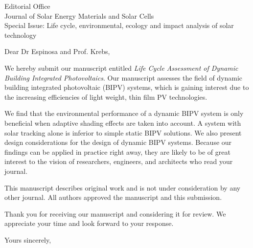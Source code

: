 \documentclass[a4paper,12pt]{letter}
\begin{document}
\begin{letter}{Editorial Office \\ Journal of Solar Energy Materials and Solar Cells\\ Special Issue: Life cycle, environmental, ecology and impact analysis of solar technology}
	\opening{Dear Dr Espinosa and Prof. Krebs,}
	We hereby submit our manuscript entitled \emph{Life Cycle Assessment of Dynamic Building Integrated Photovoltaics}. 
	Our manuscript assesses the field of dynamic building integrated photovoltaic (BIPV) systems, which is gaining interest due to the increasing efficiencies of light weight, thin film PV technologies. 




	We find that the environmental performance of a dynamic BIPV system is only beneficial when adaptive shading effects are taken into account. A system with solar tracking alone is inferior to simple static BIPV solutions. We also present design considerations for the design of dynamic BIPV systems.
	Because our findings can be applied in practice right away, they are likely to be of great interest to the vision of researchers, engineers, and architects who read your journal. 

	This manuscript describes original work and is not under consideration by any other journal. All authors approved the manuscript and this submission.


	Thank you for receiving our manuscript and considering it for review. We appreciate your time and look forward to your response.

	\signature{Prageeth Jayathissa}
	\closing{Yours sincerely,}
\end{letter}

	
\end{document}
